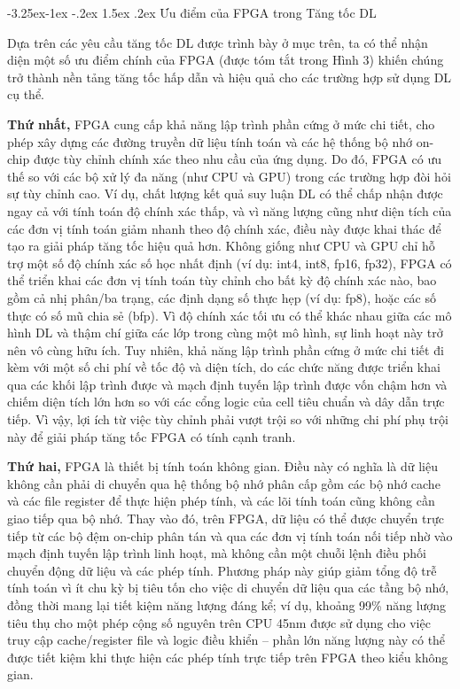 \documentclass[a4paper]{article}
\makeatletter
\newcounter {subsubsubsection}[subsubsection]
\newcommand\subsubsubsection{\@startsection{subsubsubsection}{4}{\z@}%
                                     {-3.25ex\@plus -1ex \@minus -.2ex}%
                                     {1.5ex \@plus .2ex}%
                                     {\normalfont\normalsize\bfseries}}
\makeatother
\begin{document}
\subsubsubsection{Ưu điểm của FPGA trong Tăng tốc DL}

Dựa trên các yêu cầu tăng tốc DL được trình bày ở mục trên, ta có thể nhận diện một số ưu điểm chính của FPGA (được tóm tắt trong Hình 3) khiến chúng trở thành nền tảng tăng tốc hấp dẫn và hiệu quả cho các trường hợp sử dụng DL cụ thể.

\textbf{Thứ nhất,} FPGA cung cấp khả năng lập trình phần cứng ở mức chi tiết, cho phép xây dựng các đường truyền dữ liệu tính toán và các hệ thống bộ nhớ on-chip được tùy chỉnh chính xác theo nhu cầu của ứng dụng. Do đó, FPGA có ưu thế so với các bộ xử lý đa năng (như CPU và GPU) trong các trường hợp đòi hỏi sự tùy chỉnh cao. Ví dụ, chất lượng kết quả suy luận DL có thể chấp nhận được ngay cả với tính toán độ chính xác thấp, và vì năng lượng cũng như diện tích của các đơn vị tính toán giảm nhanh theo độ chính xác, điều này được khai thác để tạo ra giải pháp tăng tốc hiệu quả hơn. Không giống như CPU và GPU chỉ hỗ trợ một số độ chính xác số học nhất định (ví dụ: int4, int8, fp16, fp32), FPGA có thể triển khai các đơn vị tính toán tùy chỉnh cho bất kỳ độ chính xác nào, bao gồm cả nhị phân/ba trạng, các định dạng số thực hẹp (ví dụ: fp8), hoặc các số thực có số mũ chia sẻ (bfp). Vì độ chính xác tối ưu có thể khác nhau giữa các mô hình DL và thậm chí giữa các lớp trong cùng một mô hình, sự linh hoạt này trở nên vô cùng hữu ích. Tuy nhiên, khả năng lập trình phần cứng ở mức chi tiết đi kèm với một số chi phí về tốc độ và diện tích, do các chức năng được triển khai qua các khối lập trình được và mạch định tuyến lập trình được vốn chậm hơn và chiếm diện tích lớn hơn so với các cổng logic của cell tiêu chuẩn và dây dẫn trực tiếp. Vì vậy, lợi ích từ việc tùy chỉnh phải vượt trội so với những chi phí phụ trội này để giải pháp tăng tốc FPGA có tính cạnh tranh.

\textbf{Thứ hai,} FPGA là thiết bị tính toán không gian. Điều này có nghĩa là dữ liệu không cần phải di chuyển qua hệ thống bộ nhớ phân cấp gồm các bộ nhớ cache và các file register để thực hiện phép tính, và các lõi tính toán cũng không cần giao tiếp qua bộ nhớ. Thay vào đó, trên FPGA, dữ liệu có thể được chuyển trực tiếp từ các bộ đệm on-chip phân tán và qua các đơn vị tính toán nối tiếp nhờ vào mạch định tuyến lập trình linh hoạt, mà không cần một chuỗi lệnh điều phối chuyển động dữ liệu và các phép tính. Phương pháp này giúp giảm tổng độ trễ tính toán vì ít chu kỳ bị tiêu tốn cho việc di chuyển dữ liệu qua các tầng bộ nhớ, đồng thời mang lại tiết kiệm năng lượng đáng kể; ví dụ, khoảng 99\% năng lượng tiêu thụ cho một phép cộng số nguyên trên CPU 45nm được sử dụng cho việc truy cập cache/register file và logic điều khiển – phần lớn năng lượng này có thể được tiết kiệm khi thực hiện các phép tính trực tiếp trên FPGA theo kiểu không gian.
\end{document}
